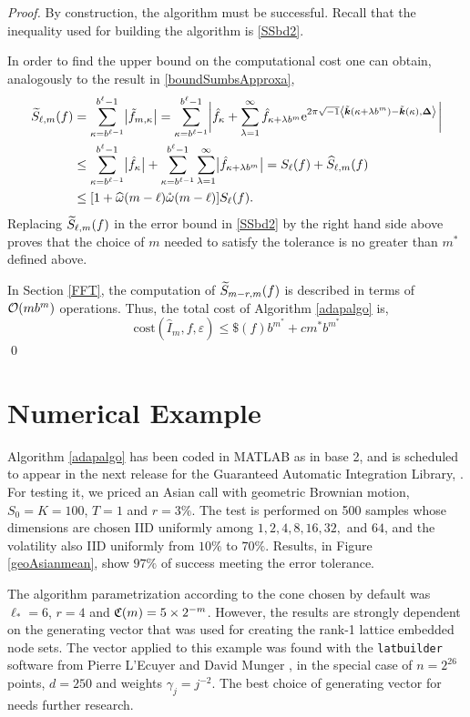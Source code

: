 \documentclass[graybox]{svmult}
\newcommand{\bsDelta}{\boldsymbol{\Delta}}    %
\begin{document}
\begin{proof}
By construction, the algorithm must be successful. Recall that the inequality used for building the algorithm is \eqref{SSbd2}.

In order to find the upper bound on the computational cost one can obtain, analogously to the result in \eqref{boundSumbsApproxa},
\begin{align}
\nonumber
\tS_{\ell,m}(f) &= \sum_{\kappa=b^{\ell-1}}^{b^{\ell}-1} \bigabs{ \tf_{m,\kappa}} = \sum_{\kappa=b^{\ell-1}}^{b^{\ell}-1} \biggabs{\hf_{\kappa} + \sum_{\lambda=1}^{\infty} \hf_{\kappa+\lambda b^{m}} \E^{2 \pi \sqrt{-1} \ip{\tvk(\kappa+\lambda b^{m}) - \tvk(\kappa)}{\bsDelta}}}\\
\nonumber
&\le \sum_{\kappa=b^{\ell-1}}^{b^{\ell}-1} \bigabs{\hf_{\kappa}} + \sum_{\kappa=b^{\ell-1}}^{b^{\ell}-1} \sum_{\lambda=1}^{\infty} \bigabs{\hf_{\kappa+\lambda b^{m}}} 
= S_{\ell}(f) + \hS_{\ell,m}(f) \\
\nonumber
&\le [1  + \homega(m-\ell) \wcomega(m-\ell)] S_\ell(f). \label{SSbd3}
\end{align}
Replacing $\widetilde{S}_{\ell,m}(f)$ in the error bound in \eqref{SSbd2} by the right hand side above proves that the choice of $m$ needed to satisfy the tolerance is no greater than  $m^*$ defined above.

In Section \ref{FFT}, the computation of $\widetilde{S}_{m-r,m}(f)$ is described in terms of $\mathcal{O}(mb^m)$ operations. Thus, the total cost of Algorithm \ref{adapalgo} is,
\[
\mathrm{cost}\left(\widehat{I}_m,f,\varepsilon\right)\leq \$(f)b^{m^*}+cm^*b^{m^*}
\]
\hfill \qed
\end{proof}

\section{Numerical Example} \label{secnumexpsec}

Algorithm \ref{adapalgo} has been coded in MATLAB as \cublat in base 2, and is scheduled to appear in the next release for the Guaranteed Automatic Integration Library, \cite{ChoEtal14a}. For testing it, we priced an Asian call with geometric Brownian motion, $S_0=K=100$, $T=1$ and $r=3\%$. The test is performed on 500 samples whose dimensions are chosen IID uniformly among $1, 2, 4, 8, 16, 32,$ and $64$, and the volatility also IID uniformly from $10\%$ to $70\%$. Results, in Figure \ref{geoAsianmean}, show $97\%$ of success meeting the error tolerance.

The algorithm parametrization according to the cone chosen by default was $\ell_*=6$, $r=4$ and $\mathfrak{C}(m)=5 \times 2^{-m}$. However, the results are strongly dependent on the generating vector that was used for creating the rank-1 lattice embedded node sets. The vector applied to this example was found with the \texttt{latbuilder} software from Pierre L'Ecuyer and David Munger \cite{LEcMun14a}, in the special case of $n=2^{26}$ points, $d=250$ and weights $\gamma_j=j^{-2}$. The best choice of generating vector for \cublat needs further research.
\end{document}
